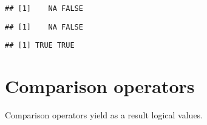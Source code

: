 \documentclass[paper=a4,headsepline,BCOR=12mm,twoside,open=right,%
titlepage,headings=small,fontsize=10pt,index=totoc,bibliography=totoc,%
captions=tableheading,captions=nooneline]{scrbook}\usepackage{knitr}
\begin{document}
\begin{knitrout}\footnotesize
{}\color{fgcolor}\begin{kframe}
\begin{alltt}
 \hlopt{&}  \hlopt{&} 
\end{alltt}
\begin{verbatim}
## [1]    NA FALSE
\end{verbatim}
\begin{alltt}
 \hlopt{&}  \hlopt{&} \hlstd{(}\hlstd{,} \hlstd{)}
\end{alltt}
\begin{verbatim}
## [1]    NA FALSE
\end{verbatim}
\begin{alltt}
 \hlopt{|}  \hlopt{|} \hlstd{(}\hlstd{,} \hlstd{)}
\end{alltt}
\begin{verbatim}
## [1] TRUE TRUE
\end{verbatim}
\end{kframe}
\end{knitrout}


\section{Comparison operators}

Comparison operators yield as a result logical values.
\end{document}
